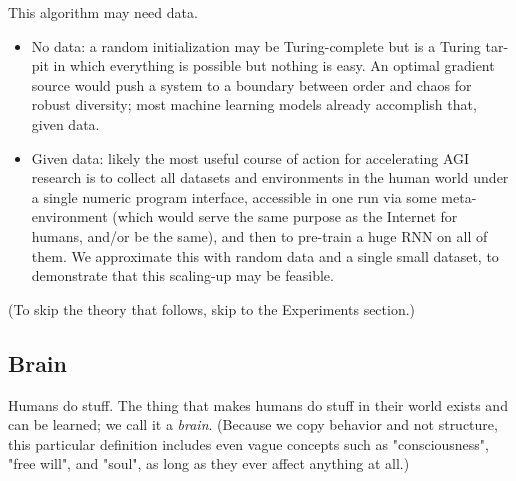 \documentclass{article}
\begin{document}
This algorithm may need data.
\begin{itemize}
\item No data: a random initialization may be Turing-complete but is a Turing tar-pit \cite{10.1145/947955.1083808} in which everything is possible but nothing is easy. An optimal gradient source would push a system to a boundary between order and chaos \cite{feng2020optimal} for robust diversity; most machine learning models already accomplish that, given data.
\item Given data: likely the most useful course of action for accelerating AGI research is to collect all datasets and environments in the human world under a single numeric program interface, accessible in one run via some meta-environment (which would serve the same purpose as the Internet for humans, and/or be the same), and then to pre-train a huge RNN on all of them. We approximate this with random data and a single small dataset, to demonstrate that this scaling-up may be feasible.
\end{itemize}

(To skip the theory that follows, skip to the Experiments section.)

\subsection{Brain}

Humans do stuff. The thing that makes humans do stuff in their world exists and can be learned; we call it a \textit{brain}. (Because we copy behavior and not structure, this particular definition includes even vague concepts such as "consciousness", "free will", and "soul", as long as they ever affect anything at all.)
\end{document}

